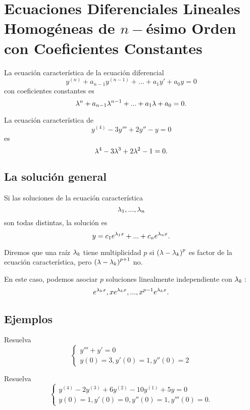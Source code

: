 \section{Ecuaciones Diferenciales Lineales Homog\'eneas de $n-$\'esimo Orden con Coeficientes Constantes}


La ecuaci\'on caracter\'istica de la ecuaci\'on diferencial
\[
	\label{bron:10.1}
	y^{(n)}+a_{n-1}y^{(n-1)}+...+a_{1}y'+a_{0}y=0
\]
con coeficientes constantes es
\[
	\label{bron:10.2}
	\lambda^{n}+a_{n-1}\lambda^{n-1}+...+a_{1}\lambda+a_{0}=0.
\]




La ecuaci\'on caracter\'istica de
$$
y^{(4)}-3y'''+2y''-y=0
$$
es
$$
\lambda^{4}-3\lambda^{3}+2\lambda^{2}-1=0.
$$


\subsection{La soluci\'on general}


Si las soluciones de la ecuaci\'on caracter\'istica
$$
\lambda_{1},...,\lambda_{n}
$$ son todas distintas, la soluci\'on es
\[
	\label{bron:10.3}
	y=c_{1}e^{\lambda_{1}x}+...+c_{n}e^{\lambda_{n}x}.
\]




Diremos que una ra\'iz $\lambda_{k}$ tiene multiplicidad $p$ si $\left( \lambda-\lambda_{k} \right)^{p}$ es factor de la ecuaci\'on caracter\'istica, pero $\left( \lambda-\lambda_{k} \right)^{p+1}$ no.

En este caso, podemos asociar $p$ soluciones linealmente independiente con $\lambda_{k}:$
$$
e^{\lambda_{k}x}, xe^{\lambda_{k}x},..., x^{p-1}e^{\lambda_{k}x}.
$$


\subsection{Ejemplos}


\begin{problema}
	Resuelva $$\begin{cases}
		y'''+y'=0\\
		y(0)=3, y'(0)=1, y''(0)=2
	\end{cases}
	$$
\end{problema}




\begin{problema}
	Resuelva
	$$\begin{cases}
		y^{(4)}-2y^{(3)}+6y^{(2)}-10y^{(1)}+5y=0 \\
		y(0)=1, y'(0)=0, y''(0)=1, y'''(0)=0.
	\end{cases}
	$$
\end{problema}



